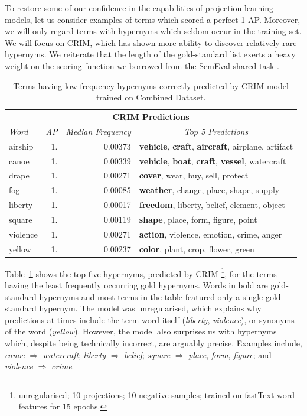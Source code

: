 To restore some of our confidence in the capabilities of projection learning models, let us consider examples of terms which scored a perfect 1 \ac{AP}.  Moreover, we will only regard terms with hypernyms which seldom occur in the training set.  We will focus on CRIM, which has shown more ability to discover relatively rare hypernyms.  We reiterate that the length of the gold-standard list exerts a heavy weight on the scoring function we borrowed from the SemEval shared task \citep{camacho2018semeval}.  

\begin{table}\centering
    \begin{tabular}{@{}lrrl@{}} \toprule
    \multicolumn{4}{c}{\textbf{CRIM Predictions}} \\
    \textit{Word} & \textit{AP} & \textit{Median Frequency} & \multicolumn{1}{c}{\textit{Top 5 Predictions}} \\ \midrule
    airship & 1. & 0.00373 & \textbf{vehicle}, \textbf{craft}, \textbf{aircraft}, airplane, artifact \\
    canoe & 1. & 0.00339 & \textbf{vehicle}, \textbf{boat}, \textbf{craft}, \textbf{vessel}, watercraft \\
    drape & 1. & 0.00271 & \textbf{cover}, wear, buy, sell, protect \\
    fog & 1. & 0.00085 & \textbf{weather}, change, place, shape, supply\\
    liberty & 1. & 0.00017 & \textbf{freedom}, liberty, belief, element, object\\
    square & 1. & 0.00119 & \textbf{shape}, place, form, figure, point\\
    violence & 1. & 0.00271 & \textbf{action}, violence, emotion, crime, anger\\
    yellow & 1. & 0.00237 & \textbf{color}, plant, crop, flower, green\\
    \bottomrule
    \end{tabular}
    \caption{Terms having low-frequency hypernyms correctly predicted by CRIM model trained on Combined Dataset.}\label{tab:crim_perfect_score}
\end{table}

Table~\ref{tab:crim_perfect_score} shows the top five hypernyms, predicted by CRIM \footnote{unregularised; 10 projections; 10 negative samples; trained on fastText word features for 15 epochs.}, for the terms having the least frequently occurring gold hypernyms.  Words in bold are gold-standard hypernyms and most terms in the table featured only a single gold-standard hypernym.  The model was unregularised, which explains why predictions at times include the term word itself (\textit{liberty}, \textit{violence}), or synonyms of the word (\textit{yellow}).  However, the model also surprises us with hypernyms which, despite being technically incorrect, are arguably precise.  Examples include, \textit{canoe} $\Rightarrow$ \textit{watercraft}; \textit{liberty} $\Rightarrow$ \textit{belief}; \textit{square} $\Rightarrow$ \textit{place}, \textit{form}, \textit{figure}; and \textit{violence} $\Rightarrow$ \textit{crime}. 

